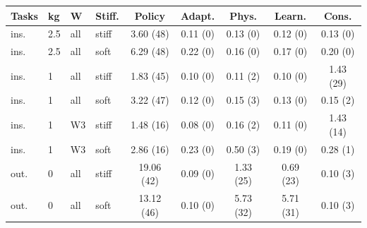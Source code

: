 \begin{tabular}{@{}llllccccc@{}}
\toprule
Tasks & kg & W & Stiff. & Policy & Adapt. & Phys. & Learn. & Cons.\\
\midrule
ins. & 2.5 & all & stiff & 3.60 (48) & 0.11 (0) & 0.13 (0) & 0.12 (0) & 0.13 (0)\\
ins. & 2.5 & all & soft & 6.29 (48) & 0.22 (0) & 0.16 (0) & 0.17 (0) & 0.20 (0)\\
ins. & 1 & all & stiff & 1.83 (45) & 0.10 (0) & 0.11 (2) & 0.10 (0) & 1.43 (29)\\
ins. & 1 & all & soft & 3.22 (47) & 0.12 (0) & 0.15 (3) & 0.13 (0) & 0.15 (2)\\
ins. & 1 & W3 & stiff & 1.48 (16) & 0.08 (0) & 0.16 (2) & 0.11 (0) & 1.43 (14)\\
ins. & 1 & W3 & soft & 2.86 (16) & 0.23 (0) & 0.50 (3) & 0.19 (0) & 0.28 (1)\\
out. & 0 & all & stiff & 19.06 (42) & 0.09 (0) & 1.33 (25) & 0.69 (23) & 0.10 (3)\\
out. & 0 & all & soft & 13.12 (46) & 0.10 (0) & 5.73 (32) & 5.71 (31) & 0.10 (3)\\
\bottomrule
\end{tabular}
